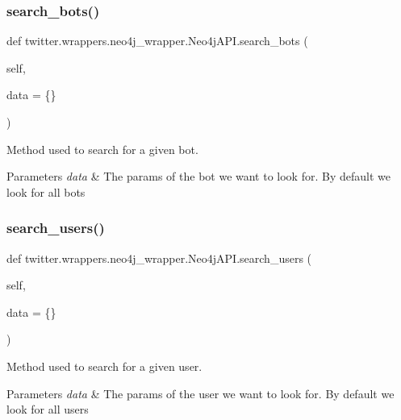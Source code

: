 \subsubsection{\texorpdfstring{search\+\_\+bots()}{search\_bots()}}
{\footnotesize\ttfamily def twitter.\+wrappers.\+neo4j\+\_\+wrapper.\+Neo4j\+A\+P\+I.\+search\+\_\+bots (\begin{DoxyParamCaption}\item[{}]{self,  }\item[{}]{data = {\ttfamily \{\}} }\end{DoxyParamCaption})}



Method used to search for a given bot. 


\begin{DoxyParams}{Parameters}
{\em data} & The params of the bot we want to look for. By default we look for all bots \\
\hline
\end{DoxyParams}
\mbox{\label{classtwitter_1_1wrappers_1_1neo4j__wrapper_1_1Neo4jAPI_a267693caebe2e0e18ed479c8fc7369bf}} 
\subsubsection{\texorpdfstring{search\+\_\+users()}{search\_users()}}
{\footnotesize\ttfamily def twitter.\+wrappers.\+neo4j\+\_\+wrapper.\+Neo4j\+A\+P\+I.\+search\+\_\+users (\begin{DoxyParamCaption}\item[{}]{self,  }\item[{}]{data = {\ttfamily \{\}} }\end{DoxyParamCaption})}



Method used to search for a given user. 


\begin{DoxyParams}{Parameters}
{\em data} & The params of the user we want to look for. By default we look for all users \\
\hline
\end{DoxyParams}
\mbox{\label{classtwitter_1_1wrappers_1_1neo4j__wrapper_1_1Neo4jAPI_a15bc8d8d0b8752f6295ab8f1e5af6986}} 
